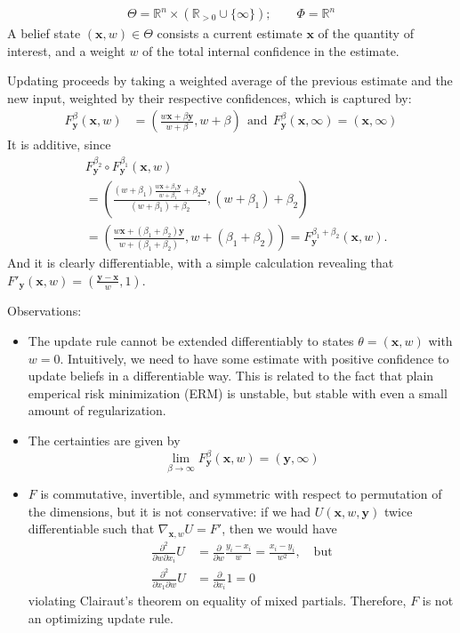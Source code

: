 \documentclass{uai2023}
\theoremstyle{plain}
\theoremstyle{definition}
\newcommand{\mat}[1]{\mathbf{#1}}
\begin{document}
\begin{example}
	\begin{align*}
		\Theta = \mathbb R^n \times (\mathbb R_{> 0} \cup \{\infty\});
		\qquad
		\Phi = \mathbb R^n \end{align*}
	A belief state $(\mat x,w) \in \Theta$ consists a current estimate $\mat x$ of the quantity of interest, and a weight $w$ of the total internal confidence in the estimate.

	Updating proceeds by taking a weighted average of the previous estimate and the new input, weighted by their respective confidences, which is captured by:
	\begin{align*}
		F^\beta_{\mat y}(\mat x, w) &=  \left( \frac{ w \mat x + \beta \mat y}{w + \beta} , w + \beta \right)
		~~\text{and}~~
		F^{\beta}_{\mat y}(\mat x, \infty) = (\mat x, \infty)
	\end{align*}
	It is additive, since
	\begin{align*}
		&F^{\beta_2}_{\mat y} \circ F^{\beta_1}_{\mat y}(\mat x, w) \\
		&= \left( \frac{ (w + \beta_1) \frac{ w \mat x + \beta_1 \mat y}{w + \beta_1} + \beta_2 \mat y}{(w + \beta_1) + \beta_2}, (w  + \beta_1) + \beta_2 \right) \\
		&= \left( \frac{  w \mat x + (\beta_1 + \beta_2) \mat y}{w + (\beta_1 + \beta_2)}, w  + (\beta_1 + \beta_2)\right)
		= F^{\beta_1 + \beta_2}_{\mat y}(\mat x, w).
	\end{align*}
	And it is clearly differentiable, with a simple calculation revealing that
	$ F'_{\mat y}(\mat x, w) = \left( \frac{\mat y - \mat x}{w}, 1\right) $.

	Observations:
	\begin{itemize}
		\item The update rule cannot be extended differentiably to states $\theta = (\mat x, w)$ with $w = 0$.
			Intuitively, we need to have some estimate with positive confidence to update beliefs in a differentiable way.
			This is related to the fact that plain emperical risk minimization (ERM) is unstable, but stable with even a small amount of regularization.
\item The certainties are given by
		\[
			\lim_{\beta \to \infty} F^{\beta}_{\mat y}(\mat x, w) = (\mat y, \infty)
		\]
\item $F$ is commutative, invertible, and symmetric with respect to permutation of the dimensions, but it is not conservative: if we had $U(\mat x, w, \mat y)$ twice differentiable such that $\nabla_{\mat x, w} U = F'$, then we would have
        \begin{align*}
        \frac{\partial^2}{\partial w \partial x_i} U &=
			\frac\partial{\partial w} \frac{y_i - x_i}{w} = \frac{x_i - y_i}{w^2},\quad\text{but}
            \\
		\frac{\partial^2}{\partial x_1 \partial w} U
			&= \frac\partial{\partial x_i} 1 = 0    
        \end{align*}
		violating Clairaut's theorem on equality of mixed partials.
		Therefore, $F$ is not an optimizing update rule.
	\end{itemize}
\end{example}
\end{document}
